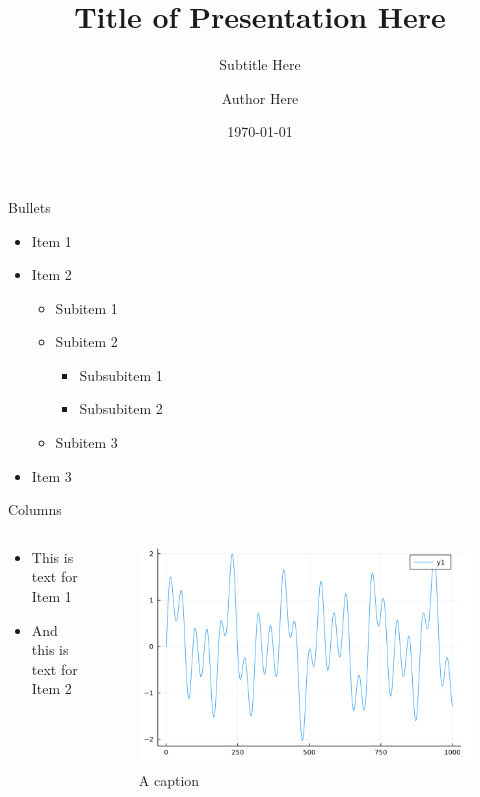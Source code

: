 \documentclass[10pt]{beamer}
\title{Title of Presentation Here}
\subtitle{Subtitle Here}
\author{Author Here}
\date{\today}
\begin{document}
\begin{frame}[plain]
\titlepage
\end{frame}

\begin{frame}{Bullets}
  \begin{itemize}
    \item Item 1
    \item {
        Item 2
        \begin{itemize}
            \item Subitem 1
            \item {
                Subitem 2
                \begin{itemize}
                    \item Subsubitem 1
                    \item Subsubitem 2
                \end{itemize}
            }
            \item Subitem 3
        \end{itemize}
    }
    \item Item 3
  \end{itemize}
\end{frame}

\begin{frame}{Columns}
    \begin{columns}[t]
        \begin{column}{0.5\textwidth}
            \begin{itemize}
                \item This is text for Item 1
                \item And this is text for Item 2
            \end{itemize}
        \end{column}

        \begin{column}{0.5\textwidth}
            \begin{figure}
                \centering
                \includegraphics[width=\textwidth]{
                    assets/slides/image-1.png
                }
                \caption{A caption}
                \label{fig:figure-a}
            \end{figure}
        \end{column}
  \end{columns}
\end{frame}
\end{document}
